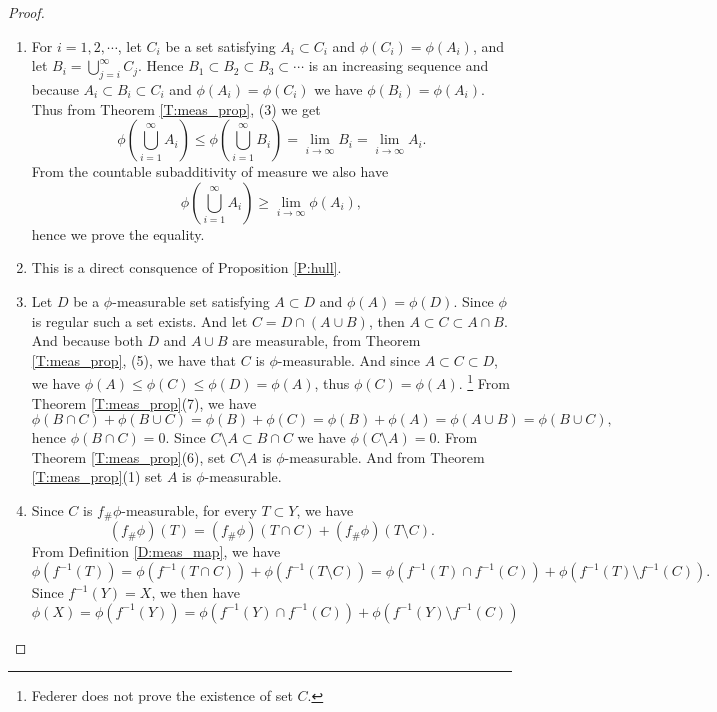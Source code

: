 \begin{proof}
\begin{enumerate}
  \item For $i=1,2,\cdots$, let $C_i$ be a set satisfying 
    $A_i\subset C_i$ and $\phi(C_i)=\phi(A_i)$, and let
    $B_i=\bigcup_{j=i}^{\infty} C_j$. Hence 
    $B_1\subset B_2\subset B_3\subset\cdots$ is an increasing sequence and
    because $A_i\subset B_i\subset C_i$ and $\phi(A_i)=\phi(C_i)$ we have
    $\phi(B_i)=\phi(A_i)$. Thus from Theorem \ref{T:meas_prop}, (3) we get
    \[
      \phi\left( \bigcup_{i=1}^{\infty} A_i \right)
        \le \phi\left( \bigcup_{i=1}^{\infty} B_i \right)
        = \lim_{i\to\infty} B_i
        = \lim_{i\to\infty} A_i.
    \]
    From the countable subadditivity of measure we also have 
    \[
      \phi\left( \bigcup_{i=1}^{\infty} A_i\right) 
        \ge \lim_{i\to\infty} \phi(A_i),
    \]
    hence we prove the equality.
  \item This is a direct consquence of Proposition \ref{P:hull}.
  \item Let $D$ be a $\phi$-measurable set satisfying $A\subset D$ and 
    $\phi(A)=\phi(D)$. Since $\phi$ is regular such a set exists. 
    And let $C=D\cap (A\cup B)$, then $A\subset C\subset A\cap B$. 
    And because both $D$ and $A\cup B$ are measurable, from Theorem 
    \ref{T:meas_prop}, (5), we have that $C$ is $\phi$-measurable.
    And since $A\subset C\subset D$, we have 
    $\phi(A)\le \phi(C)\le \phi(D)=\phi(A)$, thus $\phi(C)=\phi(A)$.
    \footnote{Federer does not prove the existence of set $C$.}
    From Theorem \ref{T:meas_prop}(7), we have
    \[
      \phi(B\cap C)+\phi(B\cup C)=\phi(B)+\phi(C)=\phi(B)+\phi(A)
        =\phi(A\cup B)=\phi(B\cup C),
    \]
    hence $\phi(B\cap C)=0$. Since $C\setminus A\subset B\cap C$ 
    we have $\phi(C\setminus A)=0$. From Theorem \ref{T:meas_prop}(6), set
    $C\setminus A$ is $\phi$-measurable. And from Theorem \ref{T:meas_prop}(1)
    set $A$ is $\phi$-measurable. 
  \item Since $C$ is $f_\#\phi$-measurable, for every $T\subset Y$, we have
    \[
      (f_\#\phi)(T) = (f_\#\phi)(T\cap C) + (f_\#\phi)(T\setminus C).
    \]
    From Definition \ref{D:meas_map}, we have
    \[
      \phi(f^{-1}(T)) = \phi(f^{-1}(T\cap C)) + \phi(f^{-1}(T\setminus C))
      = \phi(f^{-1}(T)\cap f^{-1}(C)) + \phi(f^{-1}(T)\setminus f^{-1}(C)).
    \]
    Since $f^{-1}(Y)=X$, we then have
    \[
      \phi(X)=\phi(f^{-1}(Y)) 
      = \phi(f^{-1}(Y)\cap f^{-1}(C)) + \phi(f^{-1}(Y)\setminus f^{-1}(C))
\]
\end{enumerate}
\end{proof}
